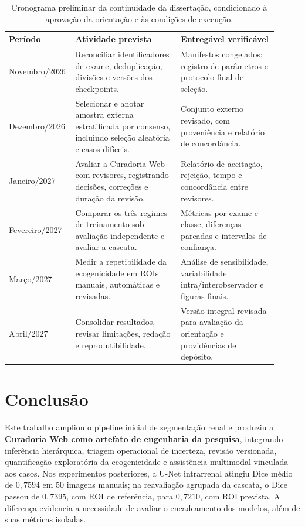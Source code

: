 \documentclass[12pt]{article}
\begin{document}
\begin{table}[!htbp]
\centering
\small
\caption[Cronograma proposto de novembro de 2026 a abril de 2027]{Cronograma preliminar da continuidade da dissertação, condicionado à aprovação da orientação e às condições de execução.}
\label{tab:cronograma_qualificacao}
\begin{tabular}{p{0.18\linewidth}p{0.38\linewidth}p{0.35\linewidth}}
\toprule
\textbf{Período} & \textbf{Atividade prevista} & \textbf{Entregável verificável} \\
\midrule
Novembro/2026 &
Reconciliar identificadores de exame, deduplicação, divisões e versões dos checkpoints. &
Manifestos congelados; registro de parâmetros e protocolo final de seleção. \\
Dezembro/2026 &
Selecionar e anotar amostra externa estratificada por consenso, incluindo seleção aleatória e casos difíceis. &
Conjunto externo revisado, com proveniência e relatório de concordância. \\
Janeiro/2027 &
Avaliar a Curadoria Web com revisores, registrando decisões, correções e duração da revisão. &
Relatório de aceitação, rejeição, tempo e concordância entre revisores. \\
Fevereiro/2027 &
Comparar os três regimes de treinamento sob avaliação independente e avaliar a cascata. &
Métricas por exame e classe, diferenças pareadas e intervalos de confiança. \\
Março/2027 &
Medir a repetibilidade da ecogenicidade em ROIs manuais, automáticas e revisadas. &
Análise de sensibilidade, variabilidade intra/interobservador e figuras finais. \\
Abril/2027 &
Consolidar resultados, revisar limitações, redação e reprodutibilidade. &
Versão integral revisada para avaliação da orientação e providências de depósito. \\
\bottomrule
\end{tabular}
\end{table}
\FloatBarrier
\fi

\section{Conclusão}
Este trabalho ampliou o pipeline inicial de segmentação renal e produziu a \textbf{Curadoria Web como artefato de engenharia da pesquisa}, integrando inferência hierárquica, triagem operacional de incerteza, revisão versionada, quantificação exploratória da ecogenicidade e assistência multimodal vinculada aos casos. Nos experimentos posteriores, a U-Net intrarrenal atingiu Dice médio de $0{,}7594$ em 50 imagens manuais; na reavaliação agrupada da cascata, o Dice passou de $0{,}7395$, com ROI de referência, para $0{,}7210$, com ROI prevista. A diferença evidencia a necessidade de avaliar o encadeamento dos modelos, além de suas métricas isoladas.
\end{document}
